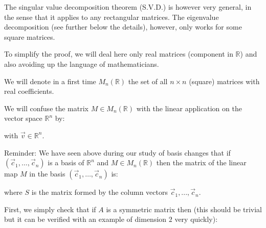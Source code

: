 	\begin{tcolorbox}[title=Remark,colframe=black,arc=10pt]
	The singular value decomposition theorem (S.V.D.) is however very general, in the sense that it applies to any rectangular matrices. The eigenvalue decomposition (see further below the details), however, only works for some square matrices.
	\end{tcolorbox}
	
	To simplify the proof, we will deal here only real matrices (component in $\mathbb{R }$) and also avoiding up the language of mathematicians.
	
	We will denote in a first time $M_n(\mathbb{R})$ the set of all $n\times n$ (square) matrices with real coefficients.
	
	We will confuse the matrix $M\in M_n (\mathbb{R})$ with the linear application on the vector space $\mathbb{R}^n$ by:
	
	with $\vec{v}\in \mathbb{R}^n$.
	
	Reminder: We have seen above during our study of basis changes that if $(\vec{c}_1,\ldots,\vec{c}_n)$ is a basis of $\mathbb{R}^n$ and $M\in M_n(\mathbb{R})$ then the matrix of the linear map $M$ in the basis $(\vec{c}_1,\ldots,\vec{c}_n)$  is:
	
	where $S$ is the matrix formed by the column vectors $\vec{c}_1,...,\vec{c}_n$.
	
	First, we simply check that if $A$ is a symmetric matrix then (this should be trivial but it can be verified with an example of dimension $2$ very quickly):
	
